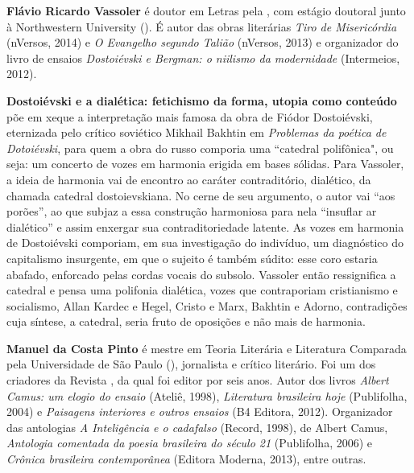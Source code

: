 
\textbf{Flávio Ricardo Vassoler} é doutor em Letras pela , com estágio doutoral junto à
  Northwestern University (). É autor das obras literárias \emph{Tiro
  de Misericórdia} (nVersos, 2014) e \emph{O Evangelho segundo Talião}
  (nVersos, 2013) e organizador do livro de ensaios \emph{Dostoiévski e
  Bergman: o niilismo da modernidade} (Intermeios, 2012).

\textbf{Dostoiévski e a dialética: fetichismo da forma, utopia como conteúdo} põe em xeque a interpretação mais famosa da obra de Fiódor Dostoiévski, eternizada pelo crítico soviético Mikhail Bakhtin em \emph{Problemas da poética de Dotoiévski}, para quem a obra do russo comporia uma ``catedral polifônica", ou seja: um concerto de vozes em harmonia erigida em bases sólidas. Para Vassoler, a ideia de harmonia vai de encontro ao caráter contraditório, dialético, da chamada catedral dostoievskiana. No cerne de seu argumento, o autor vai “aos porões”, ao que subjaz a essa construção harmoniosa para nela “insuflar ar dialético” e assim enxergar sua contraditoriedade latente. As vozes em harmonia de Dostoiévski comporiam, em sua investigação do indivíduo, um diagnóstico do capitalismo insurgente, em que o sujeito é também súdito: esse coro estaria abafado, enforcado pelas cordas vocais do subsolo. Vassoler então ressignifica a catedral e pensa uma polifonia dialética, vozes que contraporiam cristianismo e socialismo, Allan Kardec e Hegel, Cristo e Marx, Bakhtin e Adorno, contradições cuja síntese, a catedral, seria fruto de oposições e não mais de harmonia.  

\textbf{Manuel da Costa Pinto} é mestre em Teoria Literária e Literatura Comparada pela Universidade de São Paulo (), jornalista e crítico literário. Foi um dos criadores da Revista , da qual foi editor por seis anos. Autor dos livros \emph{Albert Camus: um elogio do ensaio} (Ateliê, 1998), \emph{Literatura brasileira hoje} (Publifolha, 2004) e \emph{Paisagens interiores e outros ensaios} (B4 Editora, 2012). Organizador das antologias \emph{A Inteligência e o cadafalso} (Record, 1998), de Albert Camus, \emph{Antologia comentada da poesia brasileira do século 21} (Publifolha, 2006) e \emph{Crônica brasileira contemporânea} (Editora Moderna, 2013), entre outras.






